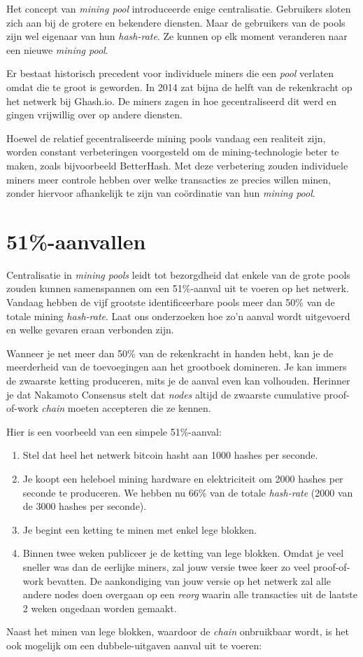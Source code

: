 \documentclass[smalldemyvopaper,11pt,twoside,onecolumn,openright,extrafontsizes]{memoir}
\begin{document}
Het concept van \textit{mining pool} introduceerde enige centralisatie. Gebruikers sloten zich aan bij de grotere en bekendere diensten. Maar de gebruikers van de pools zijn wel eigenaar van hun \textit{hash-rate}. Ze kunnen op elk moment veranderen naar een nieuwe \textit{mining pool}.

Er bestaat historisch precedent voor individuele miners die een \textit{pool} verlaten omdat die te groot is geworden. In 2014 zat bijna de helft van de rekenkracht op het netwerk bij Ghash.io. De miners zagen in hoe gecentraliseerd dit werd en gingen vrijwillig over op andere diensten.

Hoewel de relatief gecentraliseerde mining pools vandaag een realiteit zijn, worden constant verbeteringen voorgesteld om de mining-technologie beter te maken, zoals bijvoorbeeld BetterHash. Met deze verbetering zouden individuele miners meer controle hebben over welke transacties ze precies willen minen, zonder hiervoor afhankelijk te zijn van coördinatie van hun \textit{mining pool}.

\section{51\%-aanvallen}
Centralisatie in \textit{mining pools} leidt tot bezorgdheid dat enkele van de grote pools zouden kunnen samenspannen om een 51\%-aanval uit te voeren op het netwerk. Vandaag hebben de vijf grootste identificeerbare pools meer dan 50\% van de totale mining \textit{hash-rate}. Laat ons onderzoeken hoe zo’n aanval wordt uitgevoerd en welke gevaren eraan verbonden zijn.

Wanneer je net meer dan 50\% van de rekenkracht in handen hebt, kan je de meerderheid van de toevoegingen aan het grootboek domineren. Je kan immers de zwaarste ketting produceren, mits je de aanval even kan volhouden. Herinner je dat Nakamoto Consensus stelt dat \textit{nodes} altijd de zwaarste cumulative proof-of-work \textit{chain} moeten accepteren die ze kennen.

Hier is een voorbeeld van een simpele 51\%-aanval:

\begin{enumerate}
\item Stel dat heel het netwerk bitcoin hasht aan 1000 hashes per seconde.
\item Je koopt een heleboel mining hardware en elektriciteit om 2000 hashes per seconde te produceren. We hebben nu 66\% van de totale \textit{hash-rate} (2000 van de 3000 hashes per seconde).
\item Je begint een ketting te minen met enkel lege blokken.
\item Binnen twee weken publiceer je de ketting van lege blokken. Omdat je veel sneller was dan de eerlijke miners, zal jouw versie twee keer zo veel proof-of-work bevatten. De aankondiging van jouw versie op het netwerk zal alle andere nodes doen overgaan op een \textit{reorg} waarin alle transacties uit de laatste 2 weken ongedaan worden gemaakt.
\end{enumerate}
Naast het minen van lege blokken, waardoor de \textit{chain} onbruikbaar wordt, is het ook mogelijk om een dubbele-uitgaven aanval uit te voeren:
\end{document}
